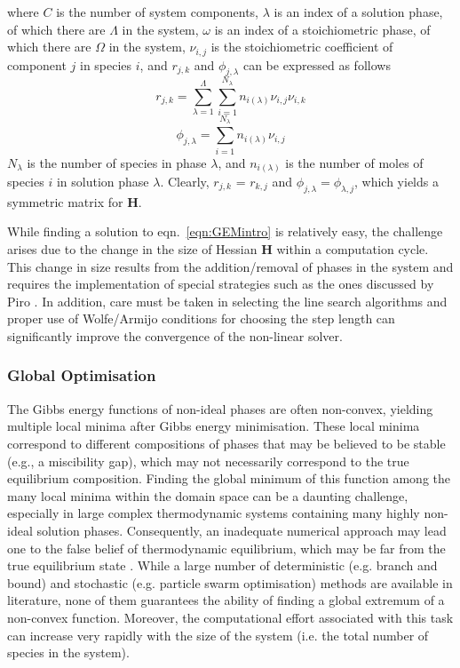     	where $C$ is the number of system components, $\lambda$ is an index of a solution phase, of which there are $\Lambda$ in the system, $\omega$ is an index of a stoichiometric phase, of which there are $\Omega$ in the system, $\nu_{i,j}$ is the stoichiometric coefficient of component $j$ in species $i$, and $r_{j,k}$ and $\phi_{j,\lambda}$ can be expressed as follows
    	\begin{equation*}
        		r_{j,k} = \sum_{\lambda = 1}^{\Lambda} \sum_{i = 1}^{N_\lambda} n_{i(\lambda)} \nu_{i,j} \nu_{i,k}
    	\end{equation*}
    	\begin{equation*}
        		\phi_{j,\lambda} = \sum_{i = 1}^{N_\lambda} n_{i(\lambda)} \nu_{i,j}
    	\end{equation*}
    	$N_\lambda$ is the number of species in phase $\lambda$, and $n_{i(\lambda)}$ is the number of moles of species $i$ in solution phase $\lambda$. Clearly, $r_{j,k}$ = $r_{k,j}$ and $\phi_{j,\lambda} = \phi_{\lambda,j}$, which yields a symmetric matrix for $\mathbf{H}$.
    
    	While finding a solution to eqn.~\ref{eqn:GEMintro} is relatively easy, the challenge arises due to the change in the size of Hessian $\mathbf{H}$ within a computation cycle. This change in size results from the addition/removal of phases in the system and requires the implementation of special strategies such as the ones discussed by Piro \cite{Piro17}. In addition, care must be taken in selecting the line search algorithms and proper use of Wolfe/Armijo conditions for choosing the step length can significantly improve the convergence of the non-linear solver.
    
	\subsubsection*{Global Optimisation}
    	The Gibbs energy functions of non-ideal phases are often non-convex, yielding multiple local minima after Gibbs energy minimisation. These local minima correspond to different compositions of phases that may be believed to be stable (e.g., a miscibility gap), which may not necessarily correspond to the true equilibrium composition. Finding the global minimum of this function among the many local minima within the domain space can be a daunting challenge, especially in large complex thermodynamic systems containing many highly non-ideal solution phases. Consequently, an inadequate numerical approach may lead one to the false belief of thermodynamic equilibrium, which may be far from the true equilibrium state \cite{Piro16}. While a large number of deterministic (e.g. branch and bound) and stochastic (e.g. particle swarm optimisation) methods are available in literature, none of them guarantees the ability of finding a global extremum of a non-convex function. Moreover, the computational effort associated with this task can increase very rapidly with the size of the system (i.e. the total number of species in the system). 
    
